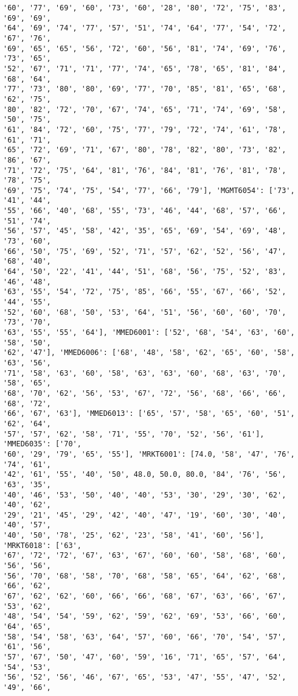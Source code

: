 \documentclass[11pt]{article}
\begin{document}
\begin{Verbatim}[commandchars=\\\{\}]
'60', '77', '69', '60', '73', '60', '28', '80', '72', '75', '83', '69', '69',
'64', '69', '74', '77', '57', '51', '74', '64', '77', '54', '72', '67', '76',
'69', '65', '65', '56', '72', '60', '56', '81', '74', '69', '76', '73', '65',
'52', '67', '71', '71', '77', '74', '65', '78', '65', '81', '84', '68', '64',
'77', '73', '80', '80', '69', '77', '70', '85', '81', '65', '68', '62', '75',
'80', '82', '72', '70', '67', '74', '65', '71', '74', '69', '58', '50', '75',
'61', '84', '72', '60', '75', '77', '79', '72', '74', '61', '78', '61', '71',
'65', '72', '69', '71', '67', '80', '78', '82', '80', '73', '82', '86', '67',
'71', '72', '75', '64', '81', '76', '84', '81', '76', '81', '78', '78', '75',
'69', '75', '74', '75', '54', '77', '66', '79'], 'MGMT6054': ['73', '41', '44',
'55', '66', '40', '68', '55', '73', '46', '44', '68', '57', '66', '51', '74',
'56', '57', '45', '58', '42', '35', '65', '69', '54', '69', '48', '73', '60',
'66', '50', '75', '69', '52', '71', '57', '62', '52', '56', '47', '68', '40',
'64', '50', '22', '41', '44', '51', '68', '56', '75', '52', '83', '46', '48',
'63', '55', '54', '72', '75', '85', '66', '55', '67', '66', '52', '44', '55',
'52', '60', '68', '50', '53', '64', '51', '56', '60', '60', '70', '73', '70',
'63', '55', '55', '64'], 'MMED6001': ['52', '68', '54', '63', '60', '58', '50',
'62', '47'], 'MMED6006': ['68', '48', '58', '62', '65', '60', '58', '63', '56',
'71', '58', '63', '60', '58', '63', '63', '60', '68', '63', '70', '58', '65',
'68', '70', '62', '56', '53', '67', '72', '56', '68', '66', '66', '68', '72',
'66', '67', '63'], 'MMED6013': ['65', '57', '58', '65', '60', '51', '62', '64',
'57', '57', '62', '58', '71', '55', '70', '52', '56', '61'], 'MMED6035': ['70',
'60', '29', '79', '65', '55'], 'MRKT6001': [74.0, '58', '47', '76', '74', '61',
'42', '61', '55', '40', '50', 48.0, 50.0, 80.0, '84', '76', '56', '63', '35',
'40', '46', '53', '50', '40', '40', '53', '30', '29', '30', '62', '40', '62',
'29', '21', '45', '29', '42', '40', '47', '19', '60', '30', '40', '40', '57',
'40', '50', '78', '25', '62', '23', '58', '41', '60', '56'], 'MRKT6018': ['63',
'67', '72', '72', '67', '63', '67', '60', '60', '58', '68', '60', '56', '56',
'56', '70', '68', '58', '70', '68', '58', '65', '64', '62', '68', '66', '62',
'67', '62', '62', '60', '66', '66', '68', '67', '63', '66', '67', '53', '62',
'48', '54', '54', '59', '62', '59', '62', '69', '53', '66', '60', '64', '65',
'58', '54', '58', '63', '64', '57', '60', '66', '70', '54', '57', '61', '56',
'57', '67', '50', '47', '60', '59', '16', '71', '65', '57', '64', '54', '53',
'56', '52', '56', '46', '67', '65', '53', '47', '55', '47', '52', '49', '66',

\end{Verbatim}
\end{document}

